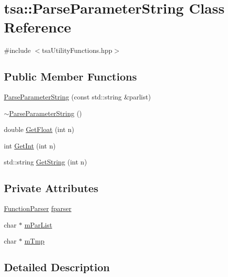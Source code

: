 \hypertarget{classtsa_1_1_parse_parameter_string}{}\section{tsa\+:\+:Parse\+Parameter\+String Class Reference}
\label{classtsa_1_1_parse_parameter_string}


{\ttfamily \#include $<$tsa\+Utility\+Functions.\+hpp$>$}

\subsection*{Public Member Functions}
\begin{DoxyCompactItemize}
\item 
\hyperlink{classtsa_1_1_parse_parameter_string_a68e6d37bb098c062d0e4eba92847c4fe}{Parse\+Parameter\+String} (const std\+::string \&parlist)
\item 
\hyperlink{classtsa_1_1_parse_parameter_string_a67bcdd6d213f9dcc3a229a105e8ad319}{$\sim$\+Parse\+Parameter\+String} ()
\item 
double \hyperlink{classtsa_1_1_parse_parameter_string_a36f54e156537db06f4aca02194cba5cf}{Get\+Float} (int n)
\item 
int \hyperlink{classtsa_1_1_parse_parameter_string_ac4ebad66e2a7645e1c49ecb87a126003}{Get\+Int} (int n)
\item 
std\+::string \hyperlink{classtsa_1_1_parse_parameter_string_a37cb52222e539bd6a3cf56cbeec0b958}{Get\+String} (int n)
\end{DoxyCompactItemize}
\subsection*{Private Attributes}
\begin{DoxyCompactItemize}
\item 
\hyperlink{class_function_parser}{Function\+Parser} \hyperlink{classtsa_1_1_parse_parameter_string_ab2648c4056632b436348effef55e73e5}{fparser}
\item 
char $\ast$ \hyperlink{classtsa_1_1_parse_parameter_string_aa90c11badf0c45d4efc7e2dd2c912100}{m\+Par\+List}
\item 
char $\ast$ \hyperlink{classtsa_1_1_parse_parameter_string_a3632dcdadae1f3578194c9ba14d4b7c8}{m\+Tmp}
\end{DoxyCompactItemize}


\subsection{Detailed Description}


